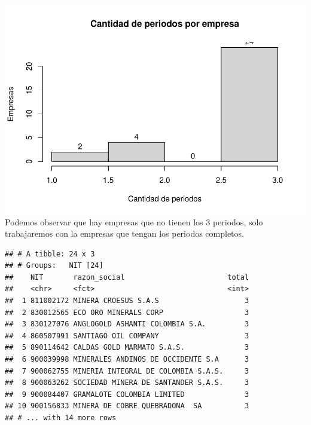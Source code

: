 \documentclass[
  11pt,
  a4paper,
]{book}
\newenvironment{Shaded}{\begin{snugshade}}{\end{snugshade}}
\newcommand{\DataTypeTok}[1]{\textcolor[rgb]{0.13,0.29,0.53}{#1}}
\newcommand{\DecValTok}[1]{\textcolor[rgb]{0.00,0.00,0.81}{#1}}
\newcommand{\KeywordTok}[1]{\textcolor[rgb]{0.13,0.29,0.53}{\textbf{#1}}}
\newcommand{\NormalTok}[1]{#1}
\newcommand{\OperatorTok}[1]{\textcolor[rgb]{0.81,0.36,0.00}{\textbf{#1}}}
\newcommand{\StringTok}[1]{\textcolor[rgb]{0.31,0.60,0.02}{#1}}
\begin{document}
\includegraphics{index_files/figure-latex/unnamed-chunk-46-1.pdf}
Podemos observar que hay empresas que no tienen los 3 periodos, solo
trabajaremos con la empresas que tengan los periodos completos.

\begin{Shaded}
\end{Shaded}

\begin{verbatim}
## # A tibble: 24 x 3
## # Groups:   NIT [24]
##    NIT       razon_social                        total
##    <chr>     <fct>                               <int>
##  1 811002172 MINERA CROESUS S.A.S                    3
##  2 830012565 ECO ORO MINERALS CORP                   3
##  3 830127076 ANGLOGOLD ASHANTI COLOMBIA S.A.         3
##  4 860507991 SANTIAGO OIL COMPANY                    3
##  5 890114642 CALDAS GOLD MARMATO S.A.S.              3
##  6 900039998 MINERALES ANDINOS DE OCCIDENTE S.A      3
##  7 900062755 MINERIA INTEGRAL DE COLOMBIA S.A.S.     3
##  8 900063262 SOCIEDAD MINERA DE SANTANDER S.A.S.     3
##  9 900084407 GRAMALOTE COLOMBIA LIMITED              3
## 10 900156833 MINERA DE COBRE QUEBRADONA  SA          3
## # ... with 14 more rows
\end{verbatim}
\end{document}
